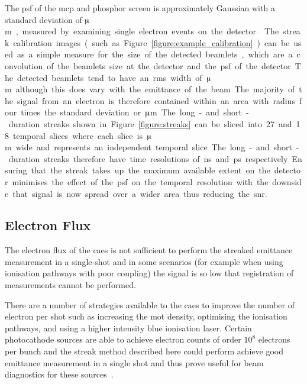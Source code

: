 The \gls{psf} of the \gls{mcp} and phosphor screen is approximately Gaussian with a standard deviation of \unit[35]{$\muup$m}, measured by examining single electron events on the detector~\cite{speirs_electron_2017}.
The streak calibration images (such as Figure~\ref{figure:example_calibration}) can be used as a simple measure for the size of the detected beamlets, which are a convolution of the beamlets size at the detector and the \gls{psf} of the detector.
The detected beamlets tend to have an \gls{rms} width of \unit[200]{$\muup$m} although this does vary with the emittance of the beam.
The majority of the signal from an electron is therefore contained within an area with radius four times the standard deviation or \unit[732]{$\muup$m}.
The long- and short-duration streaks shown in Figure~\ref{figure:streaks} can be sliced into 27 and 18 temporal slices where each slice is \unit[732]{$\muup$m} wide and represents an independent temporal slice.
The long- and short-duration streaks therefore have time resolutions of \unit[524]{ns} and \unit[247]{ps} respectively.

Ensuring that the streak takes up the maximum available extent on the detector minimises the effect of the \gls{psf} on the temporal resolution with the downside that signal is now spread over a wider area thus reducing the \gls{snr}.

\subsection{Electron Flux}
The electron flux of the \gls{caes} is not sufficient to perform the streaked emittance measurement in a single-shot and in some scenarios (for example when using ionisation pathways with poor coupling) the signal is so low that registration of measurements cannot be performed.

There are a number of strategies available to the \gls{caes} to improve the number of electron per shot such as increasing the \gls{mot} density, optimising the ionisation pathways, and using a higher intensity blue ionisation laser.
Certain photocathode sources are able to achieve electron counts of order $10^8$ electrons per bunch and the streak method described here could perform achieve good emittance measurement in a single shot and thus prove useful for beam diagnostics for these sources~\cite{li_note:_2010,musumeci_high_2010}.


